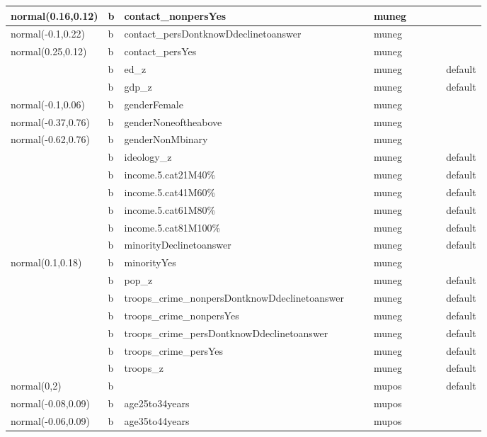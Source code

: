 \documentclass[
]{book}
\theoremstyle{definition}
\theoremstyle{definition}
\theoremstyle{definition}
\theoremstyle{definition}
\theoremstyle{remark}
\begin{document}
\begin{table}
\begin{tabular}[t]{l|l|l|l|l|l|l|l|l|l}
\hline
normal(0.16,0.12) & b & contact\_nonpersYes &  &  & muneg &  &  &  & \\
\hline
normal(-0.1,0.22) & b & contact\_persDontknowDdeclinetoanswer &  &  & muneg &  &  &  & \\
\hline
normal(0.25,0.12) & b & contact\_persYes &  &  & muneg &  &  &  & \\
\hline
 & b & ed\_z &  &  & muneg &  &  &  & default\\
\hline
 & b & gdp\_z &  &  & muneg &  &  &  & default\\
\hline
normal(-0.1,0.06) & b & genderFemale &  &  & muneg &  &  &  & \\
\hline
normal(-0.37,0.76) & b & genderNoneoftheabove &  &  & muneg &  &  &  & \\
\hline
normal(-0.62,0.76) & b & genderNonMbinary &  &  & muneg &  &  &  & \\
\hline
 & b & ideology\_z &  &  & muneg &  &  &  & default\\
\hline
 & b & income.5.cat21M40\% &  &  & muneg &  &  &  & default\\
\hline
 & b & income.5.cat41M60\% &  &  & muneg &  &  &  & default\\
\hline
 & b & income.5.cat61M80\% &  &  & muneg &  &  &  & default\\
\hline
 & b & income.5.cat81M100\% &  &  & muneg &  &  &  & default\\
\hline
 & b & minorityDeclinetoanswer &  &  & muneg &  &  &  & default\\
\hline
normal(0.1,0.18) & b & minorityYes &  &  & muneg &  &  &  & \\
\hline
 & b & pop\_z &  &  & muneg &  &  &  & default\\
\hline
 & b & troops\_crime\_nonpersDontknowDdeclinetoanswer &  &  & muneg &  &  &  & default\\
\hline
 & b & troops\_crime\_nonpersYes &  &  & muneg &  &  &  & default\\
\hline
 & b & troops\_crime\_persDontknowDdeclinetoanswer &  &  & muneg &  &  &  & default\\
\hline
 & b & troops\_crime\_persYes &  &  & muneg &  &  &  & default\\
\hline
 & b & troops\_z &  &  & muneg &  &  &  & default\\
\hline
normal(0,2) & b &  &  &  & mupos &  &  &  & default\\
\hline
normal(-0.08,0.09) & b & age25to34years &  &  & mupos &  &  &  & \\
\hline
normal(-0.06,0.09) & b & age35to44years &  &  & mupos &  &  &  & \\

\end{tabular}
\end{table}
\end{document}

